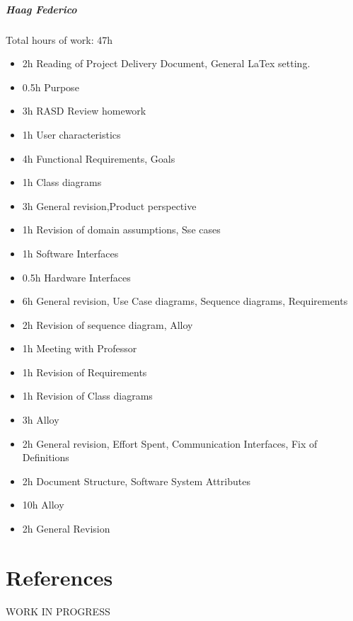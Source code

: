 \documentclass{report}
\begin{document}
		\paragraph{Haag Federico} Total hours of work: 47h
			\begin{itemize}
				\item 2h Reading of Project Delivery Document, General LaTex setting.
				\item 0.5h Purpose
				\item 3h RASD Review homework
				\item 1h User characteristics
				\item 4h Functional Requirements, Goals
				\item 1h Class diagrams
				\item 3h General revision,Product perspective
				\item 1h Revision of domain assumptions, Sse cases
				\item 1h Software Interfaces
				\item 0.5h Hardware Interfaces
				\item 6h General revision, Use Case diagrams, Sequence diagrams, Requirements
				\item 2h Revision of sequence diagram, Alloy
				\item 1h Meeting with Professor
				\item 1h Revision of Requirements
				\item 1h Revision of Class diagrams
				\item 3h Alloy
				\item 2h General revision, Effort Spent, Communication Interfaces, Fix of Definitions
				\item 2h Document Structure, Software System Attributes
				\item 10h Alloy
				\item 2h General Revision
				
			\end{itemize}
	\chapter{References}
	\thispagestyle{fancy}
	WORK IN PROGRESS
	
\end{document}
